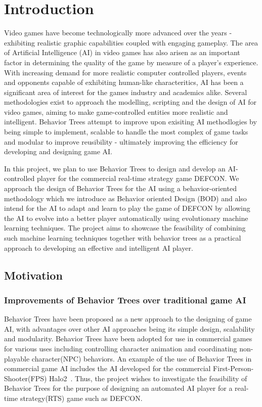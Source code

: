\chapter{Introduction}

    Video games have become technologically more advanced over the years - exhibiting realistic graphic capabilities coupled with engaging gameplay. The area of Artificial Intelligence (AI) in video games has also arisen as an important factor in determining the quality of the game by measure of a player's experience. With increasing demand for more realistic computer controlled players, events and opponents capable of exhibiting human-like characteritics, AI has been a significant area of interest for the games industry and academics alike. Several methodologies exist to approach the modelling, scripting and the design of AI for video games, aiming to make game-controlled entities more realistic and intelligent. Behavior Trees attempt to improve upon exisiting AI methodlogies by being simple to implement, scalable to handle the most complex of game tasks and modular to improve reusibility - ultimately improving the efficiency for developing and designing game AI. 

    In this project, we plan to use Behavior Trees to design and develop an AI-controlled player for the commercial real-time strategy game DEFCON. We approach the design of Behavior Trees for the AI using a behavior-oriented methodology which we introduce as Behavior oriented Design (BOD) and also intend for the AI to adapt and learn to play the game of DEFCON by allowing the AI to evolve into a better player automatically using evolutionary machine learning techniques. The project aims to showcase the feasibility of combining such machine learning techniques together with behavior trees as a practical approach to developing an effective and intelligent AI player.

    \newpage
    \section{Motivation}
    
    \subsection{Improvements of Behavior Trees over traditional game AI}
    Behavior Trees have been proposed as a new approach to the designing of game AI, with advantages over other AI approaches being its simple design, scalability and modularity. Behavior Trees have been adopted for use in commercial games for various uses including controlling character animation and coordinating non-playable character(NPC) behaviors. An example of the use of Behavior Trees in commercial game AI includes the AI developed for the commercial First-Person-Shooter(FPS) Halo2~\cite{isla}. Thus, the project wishes to investigate the feasibility of Behavior Trees for the purpose of designing an automated AI player for a real-time strategy(RTS) game such as DEFCON.
    

